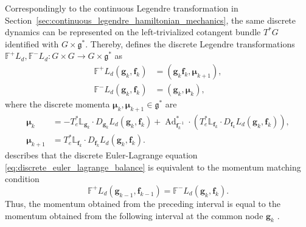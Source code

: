 Correspondingly to the continuous Legendre transformation in Section~\ref{sec:continuous_legendre_hamiltonian_mechanics}, the same discrete dynamics can be represented on the left-trivialized cotangent bundle $T^*G$ 
identified with $G\times\mathfrak g^*$. Thereby, \cite{Lee2008} defines the discrete Legendre 
transformations $\mathbb{F}^+L_d, \mathbb{F}^- L_d: G \times G \to G \times \mathfrak{g}^*$ 
as
\begin{subequations}
\label{eq:discrete_legendre_transformations}
\begin{align}
    \mathbb F^+L_d(\bm{g}_k,\bm{f}_k)
    &=
    (\bm{g}_k\bm{f}_k,\bm{\mu}_{k+1}),
    \label{eq:positive_discrete_legendre_transformation}\\
    \mathbb F^-L_d(\bm{g}_k,\bm{f}_k)
    &=
    (\bm{g}_k,\bm{\mu}_k),
    \label{eq:negative_discrete_legendre_transformation}
\end{align}
\end{subequations}
where the discrete momenta $\bm{\mu}_k,\bm{\mu}_{k+1}\in\mathfrak g^*$ are
\begin{subequations}
\label{eq:discrete_momenta}
\begin{align}
    \bm{\mu}_k
    &=
    -T_e^*\mathbb{L}_{\bm{g}_k} \cdot D_{\bm{g}_k}L_d(\bm{g}_k,\bm{f}_k)
    +
    \operatorname{Ad}_{\bm{f}_k^{-1}}^* \cdot
    \left(T_e^*\mathbb{L}_{\bm{f}_k} \cdot D_{\bm{f}_k}L_d(\bm{g}_k,\bm{f}_k)\right),
    \label{eq:negative_discrete_momentum}\\
    \bm{\mu}_{k+1}
    &=
    T_e^*\mathbb{L}_{\bm{f}_k} \cdot D_{\bm{f}_k}L_d(\bm{g}_k,\bm{f}_k).
    \label{eq:positive_discrete_momentum}
\end{align}
\end{subequations}
\cite{Marsden2001} describes that the discrete Euler-Lagrange equation \eqref{eq:discrete_euler_lagrange_balance} is equivalent to the momentum matching condition
\begin{equation}
    \mathbb F^+L_d(\bm{g}_{k-1},\bm{f}_{k-1})
    =
    \mathbb F^-L_d(\bm{g}_k,\bm{f}_k).
    \label{eq:discrete_momentum_matching}
\end{equation}
Thus, the momentum obtained from the preceding interval is equal to the momentum obtained from the following interval at the common node $\bm{g}_k$ \cite{Marsden2001}.

